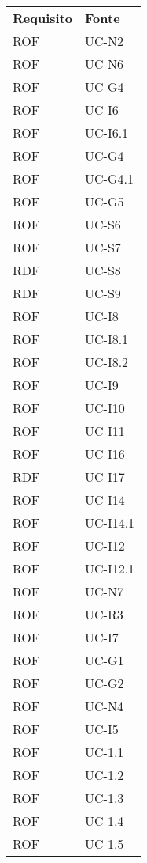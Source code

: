 \begin{longtable}{| p{5cm} | p{5cm} |}
		\rowcolor{LightBlue}
		\color{white}\bfseries Requisito & \color{white}\bfseries Fonte \\[0.25cm]
		\rowcolor{LightGray}
		ROF & UC-N2\\
		ROF & UC-N6\\
		\rowcolor{LightGray}
		ROF & UC-G4\\
		ROF & UC-I6\\
		\rowcolor{LightGray}
		ROF & UC-I6.1\\
		ROF & UC-G4\\
		\rowcolor{LightGray}
		ROF & UC-G4.1\\
		ROF & UC-G5\\
		\rowcolor{LightGray}
		ROF & UC-S6\\
		ROF & UC-S7\\
		RDF & UC-S8\\
		RDF & UC-S9\\
		ROF & UC-I8\\
		\rowcolor{LightGray}
		ROF & UC-I8.1\\
		ROF & UC-I8.2\\
		\rowcolor{LightGray}
		ROF & UC-I9\\
		ROF & UC-I10\\
		\rowcolor{LightGray}
		ROF & UC-I11\\
		ROF & UC-I16\\
		RDF & UC-I17\\
		\rowcolor{LightGray}
		ROF & UC-I14\\
		ROF & UC-I14.1\\
		ROF & UC-I12\\
		ROF & UC-I12.1\\
		\rowcolor{LightGray}
		ROF & UC-N7\\
		ROF & UC-R3\\
		\rowcolor{LightGray}
		ROF & UC-I7\\
		ROF & UC-G1\\
		\rowcolor{LightGray}
		ROF & UC-G2\\
		ROF & UC-N4\\
		\rowcolor{LightGray}
		ROF & UC-I5\\
		ROF & UC-1.1\\
		\rowcolor{LightGray}
		ROF & UC-1.2\\
		ROF & UC-1.3\\
		\rowcolor{LightGray}
		ROF & UC-1.4\\
		ROF & UC-1.5\\

\end{longtable}
